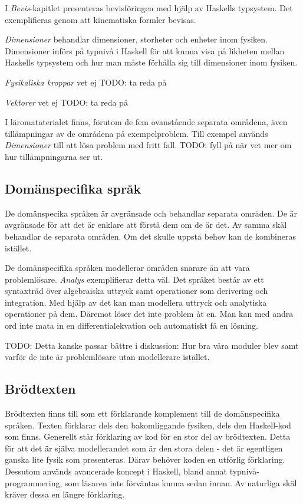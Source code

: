 \begin{binge}
I \textit{Bevis}-kapitlet presenteras bevisföringen med hjälp av Haskells typsystem. Det exemplifieras genom att kinematiska formler bevisas.

\textit{Dimensioner} behandlar dimensioner, storheter och enheter inom fysiken. Dimensioner införs på typnivå i Haskell för att kunna visa på likheten mellan Haskells typsystem och hur man måste förhålla sig till dimensioner inom fysiken.

\textit{Fysikaliska kroppar} vet ej TODO: ta reda på

\textit{Vektorer} vet ej TODO: ta reda på

I läromataterialet finns, förutom de fem ovanstående separata områdena, även tillämpningar av de områdena på exempelproblem. Till exempel används \textit{Dimensioner} till att lösa problem med fritt fall. TODO: fyll på när vet mer om hur tillämpningarna ser ut.

\subsection{Domänspecifika språk}

De domänspecika språken är avgränsade och behandlar separata områden. De är avgränsade för att det är enklare att förstå dem om de är det. Av samma skäl behandlar de separata områden. Om det skulle uppstå behov kan de kombineras istället.

De domänspecifika språken modellerar områden snarare än att vara problemlösare. \textit{Analys} exemplifierar detta väl. Det språket består av ett syntaxträd över algebraiska uttryck samt operationer som derivering och integration. Med hjälp av det kan man modellera uttryck och analytiska operationer på dem. Däremot löser det inte problem åt en. Man kan med andra ord inte mata in en differentialekvation och automatiskt få en lösning.

TODO: Detta kanske passar bättre i diskussion: Hur bra våra moduler blev samt varför de inte är problemlösare utan modellerare istället.

\subsection{Brödtexten}

Brödtexten finns till som ett förklarande komplement till de domänspecifika språken. Texten förklarar dels den bakomliggande fysiken, dels den Haskell-kod som finns. Generellt står förklaring av kod för en stor del av brödtexten. Detta för att det är själva modellerandet som är den stora delen - det är egentligen ganska lite fysik som presenteras. Därav behöver koden en utförlig förklaring. Dessutom används avancerade koncept i Haskell, bland annat typnivå-programmering, som läsaren inte förväntas kunna sedan innan. Av naturliga skäl kräver dessa en längre förklaring.


\end{binge}
